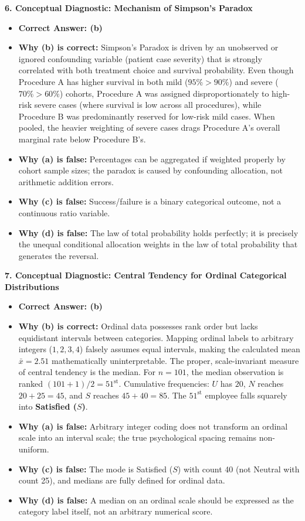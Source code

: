 \textbf{6. Conceptual Diagnostic: Mechanism of Simpson's Paradox}
\begin{itemize}
    \item \textbf{Correct Answer: (b)}
    \item \textbf{Why (b) is correct:} Simpson's Paradox is driven by an unobserved or ignored confounding variable (patient case severity) that is strongly correlated with both treatment choice and survival probability. Even though Procedure A has higher survival in both mild ($95\% > 90\%$) and severe ($70\% > 60\%$) cohorts, Procedure A was assigned disproportionately to high-risk severe cases (where survival is low across all procedures), while Procedure B was predominantly reserved for low-risk mild cases. When pooled, the heavier weighting of severe cases drags Procedure A's overall marginal rate below Procedure B's.
    \item \textbf{Why (a) is false:} Percentages can be aggregated if weighted properly by cohort sample sizes; the paradox is caused by confounding allocation, not arithmetic addition errors.
    \item \textbf{Why (c) is false:} Success/failure is a binary categorical outcome, not a continuous ratio variable.
    \item \textbf{Why (d) is false:} The law of total probability holds perfectly; it is precisely the unequal conditional allocation weights in the law of total probability that generates the reversal.
\end{itemize}

\textbf{7. Conceptual Diagnostic: Central Tendency for Ordinal Categorical Distributions}
\begin{itemize}
    \item \textbf{Correct Answer: (b)}
    \item \textbf{Why (b) is correct:} Ordinal data possesses rank order but lacks equidistant intervals between categories. Mapping ordinal labels to arbitrary integers ($1, 2, 3, 4$) falsely assumes equal intervals, making the calculated mean $\bar{x} = 2.51$ mathematically uninterpretable. The proper, scale-invariant measure of central tendency is the median. For $n = 101$, the median observation is ranked $(101 + 1)/2 = 51^{\text{st}}$. Cumulative frequencies: $U$ has $20$, $N$ reaches $20 + 25 = 45$, and $S$ reaches $45 + 40 = 85$. The $51^{\text{st}}$ employee falls squarely into \textbf{Satisfied ($S$)}.
    \item \textbf{Why (a) is false:} Arbitrary integer coding does not transform an ordinal scale into an interval scale; the true psychological spacing remains non-uniform.
    \item \textbf{Why (c) is false:} The mode is Satisfied ($S$) with count 40 (not Neutral with count 25), and medians are fully defined for ordinal data.
    \item \textbf{Why (d) is false:} A median on an ordinal scale should be expressed as the category label itself, not an arbitrary numerical score.
\end{itemize}


